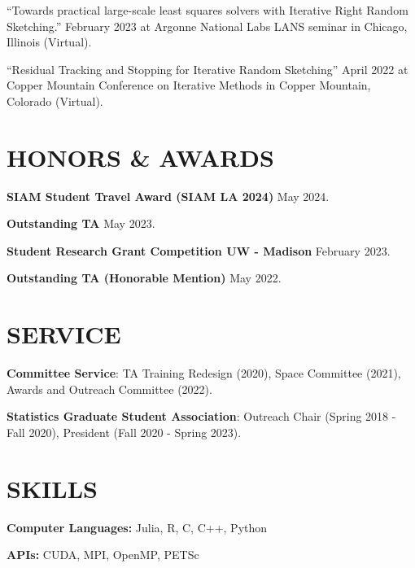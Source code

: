 \documentclass[margin,11pt]{res}
\begin{document}
\begin{resume}
``Towards practical large-scale least squares solvers with Iterative Right Random Sketching.'' February 2023 at Argonne National Labs LANS seminar in Chicago, Illinois (Virtual).

``Residual Tracking and Stopping for Iterative Random Sketching'' April 2022 at Copper Mountain Conference on Iterative Methods in Copper Mountain, Colorado (Virtual).




\section{HONORS \& AWARDS} 
{\bf SIAM Student Travel Award (SIAM LA 2024)} \hfill May 2024.

{\bf Outstanding TA} \hfill May 2023.

{\bf Student Research Grant Competition UW - Madison} \hfill February 2023.

{\bf Outstanding TA (Honorable Mention)} \hfill May 2022.

\section{SERVICE}

\textbf{Committee Service}: TA Training Redesign (2020), Space Committee (2021), Awards and Outreach Committee (2022).

\textbf{Statistics Graduate Student Association}: Outreach Chair (Spring 2018 - Fall 2020), President (Fall 2020 - Spring 2023). 

\section{SKILLS}
\textbf{Computer Languages:} Julia, R, C, C++, Python

\textbf{APIs:} CUDA, MPI, OpenMP, PETSc

\end{resume}
\end{document}
